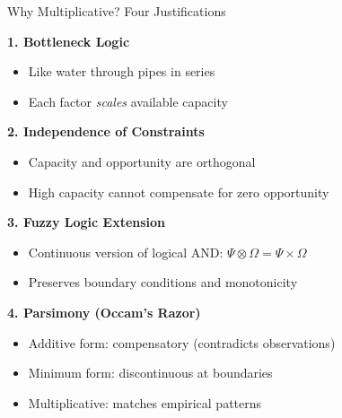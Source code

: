 \documentclass[aspectratio=169]{beamer}
\begin{document}
\begin{frame}{Why Multiplicative? Four Justifications}

\textbf{1. Bottleneck Logic}
\begin{itemize}
    \item Like water through pipes in series
    \item Each factor \textit{scales} available capacity
\end{itemize}

\textbf{2. Independence of Constraints}
\begin{itemize}
    \item Capacity and opportunity are orthogonal
    \item High capacity cannot compensate for zero opportunity
\end{itemize}

\textbf{3. Fuzzy Logic Extension}  
\begin{itemize}
    \item Continuous version of logical AND: $\Psi \otimes \Omega = \Psi \times \Omega$
    \item Preserves boundary conditions and monotonicity
\end{itemize}

\textbf{4. Parsimony (Occam's Razor)}
\begin{itemize}
    \item Additive form: compensatory (contradicts observations)
    \item Minimum form: discontinuous at boundaries
    \item Multiplicative: matches empirical patterns
\end{itemize}

\end{frame}
\end{document}

